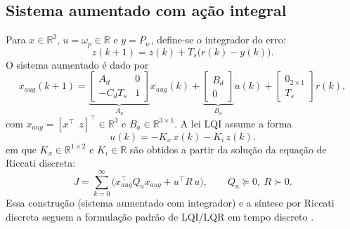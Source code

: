 \subsection{Sistema aumentado com ação integral}
\label{sec:lqi-mimo}
Para $x\in\mathbb{R}^2$, $u=\omega_p\in\mathbb{R}$ e $y=P_w$, define-se o integrador do erro:
\[
    z(k+1)=z(k)+T_s\big(r(k)-y(k)\big).
\]
O sistema aumentado é dado por
\[
    x_{aug}(k+1)=
    \underbrace{\begin{bmatrix}
            A_d      & 0 \\
            -C_d T_s & 1
        \end{bmatrix}}_{A_a}
    x_{aug}(k)
    +
    \underbrace{\begin{bmatrix}
            B_d \\
            0
        \end{bmatrix}}_{B_a}
    u(k)
    +
    \begin{bmatrix}
        0_{2\times 1} \\
        T_s
    \end{bmatrix}r(k),
\]
com $x_{aug}=[x^\top\ \ z]^\top\in\mathbb{R}^3$ e $B_a\in\mathbb{R}^{3\times 1}$. A lei LQI assume a forma
\[
    u(k)=-K_x\,x(k)-K_i\,z(k).
\]
em que $K_x\in\mathbb{R}^{1\times 2}$ e $K_i\in\mathbb{R}$ são obtidos a partir da solução da equação de Riccati discreta:
\[
    J=\sum_{k=0}^{\infty}\big(x_{aug}^\top Q_a x_{aug}+u^\top R\,u\big),\qquad
    Q_a\succeq 0,\ R\succ 0.
\]
Essa construção (sistema aumentado com integrador) e a síntese por Riccati discreta seguem a formulação padrão de LQI/LQR em tempo discreto \cite{FranklinPowellWorkman1998,Ogata1997,BrunoAAngelico2018}.
